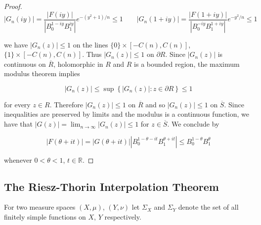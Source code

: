 \begin{proof}
\begin{equation*}
	\left| G_n(iy)\right| = \frac{\left| F(iy)\right|}{\left| B_0^{1 - iy} B_1^{iy}\right|}e^{-\left( y^2 + 1 \right)/n} \leq 1 \qquad \left| G_n(1 + iy)\right| =	\frac{\left| F(1 + iy)\right|}{\left| B_0^{-iy}B_1^{1 + iy}\right|}e^{-y^2/n} \leq 1
\end{equation*}

\noindent we have $\left| G_n(z)\right| \leq 1$ on the lines $\{0\} \times [-C(n),C(n)]$, $\{1\} \times [-C(n),C(n)]$. Thus $\left| G_n(z) \right| \leq 1$ on $\partial R$. Since $\left| G_n(z)\right|$ is continuous on $\overline{R}$, holomorphic in $R$ and $R$ is a bounded region, the maximum modulus theorem implies

\begin{equation*}
	\left| G_n(z)\right| \leq \sup\left\{ \left|G_n(z) \right| : z \in \partial R \right\} \leq 1
\end{equation*}

\noindent for every $z \in R$. Therefore $\left| G_n(z) \right| \leq 1$ on $\overline{R}$ and so $\left| G_n(z) \right| \leq 1$ on $\overline{S}$. Since inequalities are preserved by limits and the modulus is a continuous function, we have that $\left| G(z) \right| = \lim_{n \to \infty} \left| G_n(z) \right| \leq 1$ for $z \in \overline{S}$. We conclude by 

\begin{equation*}
	\left| F(\theta + it) \right| = \left| G(\theta + it) \right| | B_0^{1 - \theta - it}B_1^{\theta + it}| \leq B_0^{1 - \theta} B_1^{\theta}
\end{equation*}

\noindent whenever $0 < \theta < 1$, $t \in \mathbb{R}$.
\end{proof}

\subsection{The Riesz-Thorin Interpolation Theorem}
For two measure spaces $\left( X,\mu \right)$, $\left( Y,\nu \right)$ let $\Sigma_X$ and $\Sigma_Y$ denote the set of all finitely simple functions on $X$, $Y$ respectively.

\vspace{2mm}


